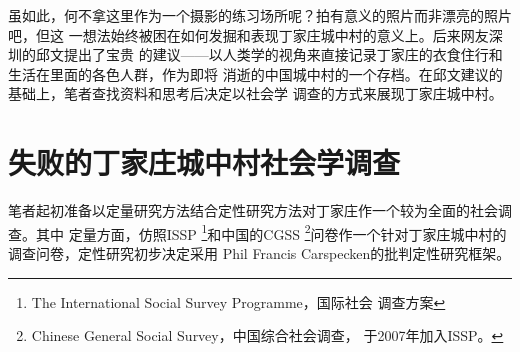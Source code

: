 虽如此，何不拿这里作为一个摄影的练习场所呢？拍有意义的照片而非漂亮的照片吧，但这
一想法始终被困在如何发掘和表现丁家庄城中村的意义上。后来网友深圳的邱文提出了宝贵
的建议——以人类学的视角来直接记录丁家庄的衣食住行和生活在里面的各色人群，作为即将
消逝的中国城中村的一个存档。在邱文建议的基础上，笔者查找资料和思考后决定以社会学
调查的方式来展现丁家庄城中村。

\section{失败的丁家庄城中村社会学调查}

笔者起初准备以定量研究方法结合定性研究方法对丁家庄作一个较为全面的社会调查。其中
定量方面，仿照ISSP \footnote{The International Social Survey Programme，国际社会
调查方案}和中国的CGSS \footnote{Chinese General Social Survey，中国综合社会调查，
于2007年加入ISSP。}问卷作一个针对丁家庄城中村的调查问卷，定性研究初步决定采用
Phil Francis Carspecken的批判定性研究框架。

